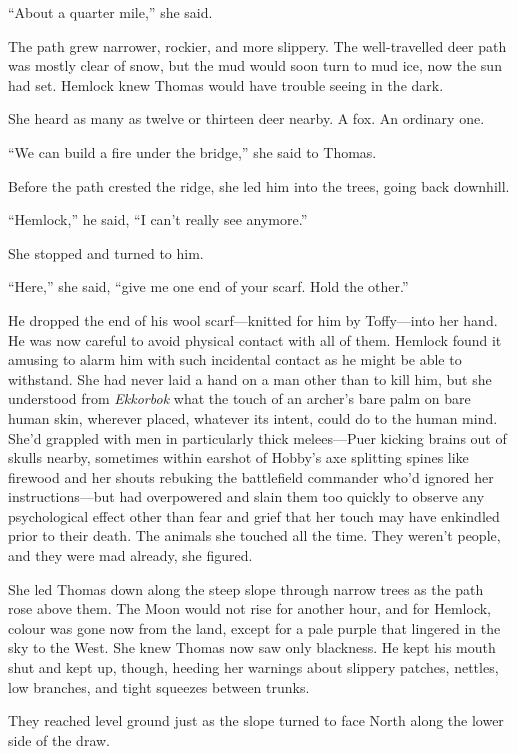 \documentclass[11pt,a5paper]{article}
\begin{document}
``About a quarter mile,'' she said.

The path grew narrower, rockier, and more slippery. The well-travelled deer path was mostly clear of snow, but the mud would soon turn to mud ice, now the sun had set. Hemlock knew Thomas would have trouble seeing in the dark.

She heard as many as twelve or thirteen deer nearby. A fox. An ordinary one.

``We can build a fire under the bridge,'' she said to Thomas.

Before the path crested the ridge, she led him into the trees, going back downhill.

``Hemlock,'' he said, ``I can't really see anymore.''

She stopped and turned to him.

``Here,'' she said, ``give me one end of your scarf. Hold the other.''

He dropped the end of his wool scarf---knitted for him by Toffy---into her hand. He was now careful to avoid physical contact with all of them. Hemlock found it amusing to alarm him with such incidental contact as he might be able to withstand. She had never laid a hand on a man other than to kill him, but she understood from \emph{Ekkorbok} what the touch of an archer's bare palm on bare human skin, wherever placed, whatever its intent, could do to the human mind. She'd grappled with men in particularly thick melees---Puer kicking brains out of skulls nearby, sometimes within earshot of Hobby's axe splitting spines like firewood and her shouts rebuking the battlefield commander who'd ignored her instructions---but had overpowered and slain them too quickly to observe any psychological effect other than fear and grief that her touch may have enkindled prior to their death. The animals she touched all the time. They weren't people, and they were mad already, she figured.

She led Thomas down along the steep slope through narrow trees as the path rose above them. The Moon would not rise for another hour, and for Hemlock, colour was gone now from the land, except for a pale purple that lingered in the sky to the West. She knew Thomas now saw only blackness. He kept his mouth shut and kept up, though, heeding her warnings about slippery patches, nettles, low branches, and tight squeezes between trunks.

They reached level ground just as the slope turned to face North along the lower side of the draw. 
\end{document}
